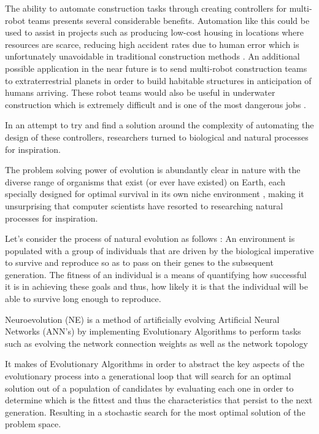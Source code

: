 The ability to automate construction tasks through creating controllers for multi-robot teams presents several considerable benefits. Automation like this could be used to assist in projects such as producing low-cost housing in locations where resources are scarce, reducing high accident rates due to human error which is unfortunately unavoidable in traditional construction methods \cite{Khoshnevis2003}. An additional possible application in the near future is to send multi-robot construction teams to extraterrestrial planets in order to build habitable structures in anticipation of humans arriving. These robot teams would also be useful in underwater construction which is extremely difficult and is one of the most dangerous jobs \cite{RefWorks:30}.

In an attempt to try and find a solution around the complexity of automating the design of these controllers, researchers turned to biological and natural processes for inspiration.

The problem solving power of evolution is abundantly clear in nature with the diverse range of organisms that exist (or ever have existed) on Earth, each specially designed for optimal survival in its own niche environment \cite{RefWorks:33}, making it unsurprising that computer scientists have resorted to researching natural processes for inspiration. 

Let's consider the process of natural evolution as follows \cite{RefWorks:33}: An environment is populated with a group of individuals that are driven by the biological imperative to survive and reproduce so as to pass on their genes to the subsequent generation. The fitness of an individual is a means of quantifying how successful it is in achieving these goals and thus, how likely it is that the individual will be able to survive long enough to reproduce.

Neuroevolution (NE) is a method of artificially evolving Artificial Neural Networks (ANN's) by implementing Evolutionary Algorithms to perform tasks such as evolving the network connection weights as well as the network topology \cite{Stanley2004, XinYao1999}

It makes of Evolutionary Algorithms in order to abstract the key aspects of the evolutionary process into a generational loop that will search for an optimal solution out of a population of candidates by evaluating each one in order to determine which is the fittest and thus the characteristics that persist to the next generation. Resulting in a stochastic search for the most optimal solution of the problem space.

